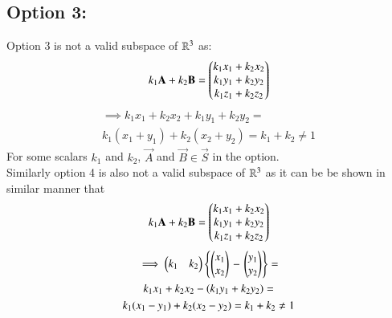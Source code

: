 \documentclass[journal,12pt,twocolumn]{IEEEtran}
\begin{document}
\subsection{Option 3:}
Option 3 is not a valid subspace of $\mathbb{R}^3$ as:
\begin{align}
  k_1\mathbf{A} + k_2\mathbf{B} = \begin{pmatrix}k_1x_1 + k_2x_2 \\ k_1y_1 + k_2y_2 \\ k_1z_1 + k_2z_2\end{pmatrix}
\end{align}
\begin{multline}
  \implies k_1x_1+k_2x_2+k_1y_1+k_2y_2 = \\
  k_1(x_1+y_1)+k_2(x_2+ y_2) = k_1 + k_2 \neq 1
\end{multline}
For some scalars $k_1$ and $k_2$, $\vec{A}$ and $\vec{B} \in \vec{S}$ in the option. \\
Similarly option 4 is also not a valid subspace of $\mathbb{R}^3$ as it can be be shown in similar manner that
\begin{align}
  k_1\mathbf{A} + k_2\mathbf{B} = \begin{pmatrix}k_1x_1 + k_2x_2 \\ k_1y_1 + k_2y_2 \\ k_1z_1 + k_2z_2\end{pmatrix}
\end{align}
\begin{multline}
  \implies \begin{pmatrix}k_1 & k_2\end{pmatrix}\left\{\begin{pmatrix}x_1 \\ x_2\end{pmatrix}\right. - \left.\begin{pmatrix}y_1 \\ y_2\end{pmatrix}\right\} = \\
  k_1x_1+k_2x_2-(k_1y_1+k_2y_2) = \\
  k_1(x_1-y_1)+k_2(x_2-y_2) = k_1 + k_2 \neq 1
\end{multline}
\end{document}
